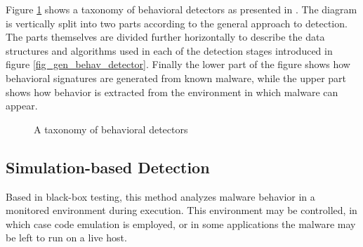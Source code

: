 Figure \ref{fig_behav_det_tax} shows a taxonomy of behavioral detectors as presented in \cite{Jacob08}. The diagram is vertically split into two parts according to the general approach to detection. The parts themselves are divided further horizontally to describe the data structures and algorithms used in each of the detection stages introduced in figure \ref{fig_gen_behav_detector}. Finally the lower part of the figure shows how behavioral signatures are generated from known malware, while the upper part shows how behavior is extracted from the environment in which malware can appear.

\begin{figure}[H]
    \centering
    \caption{A taxonomy of behavioral detectors}
    \label{fig_behav_det_tax}
\end{figure}

\subsection{Simulation-based Detection}
Based in black-box testing, this method analyzes malware behavior in a monitored environment during execution. This environment may be controlled, in which case code emulation is employed, or in some applications the malware may be left to run on a live host.

